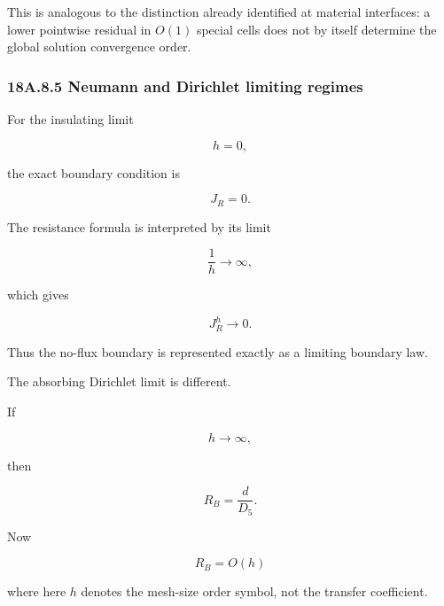 \documentclass[11pt,a4paper]{article}
\begin{document}
This is analogous to the distinction already identified at material interfaces: a lower pointwise residual in $O(1)$ special cells does not by itself determine the global solution convergence order.

\subsubsection*{18A.8.5 Neumann and Dirichlet limiting regimes}

For the insulating limit

\begin{equation}
h=0,
\tag{TRISO-ACC-253}
\label{eq:triso-acc-253}
\end{equation}

the exact boundary condition is

\begin{equation}
J_R=0.
\tag{TRISO-ACC-254}
\label{eq:triso-acc-254}
\end{equation}

The resistance formula is interpreted by its limit

\begin{equation}
\frac1h\to\infty,
\tag{TRISO-ACC-255}
\label{eq:triso-acc-255}
\end{equation}

which gives

\begin{equation}
J_R^h\to0.
\tag{TRISO-ACC-256}
\label{eq:triso-acc-256}
\end{equation}

Thus the no-flux boundary is represented exactly as a limiting boundary law.

The absorbing Dirichlet limit is different.

If

\begin{equation}
h\to\infty,
\tag{TRISO-ACC-257}
\label{eq:triso-acc-257}
\end{equation}

then

\begin{equation}
R_B
=
\frac d{D_5}.
\tag{TRISO-ACC-258}
\label{eq:triso-acc-258}
\end{equation}

Now

\begin{equation}
R_B=O(h)
\tag{TRISO-ACC-259}
\label{eq:triso-acc-259}
\end{equation}

where here $h$ denotes the mesh-size order symbol, not the transfer coefficient.
\end{document}
